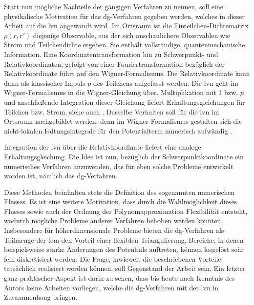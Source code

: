 Statt nun mögliche Nachteile der gängigen Verfahren zu nennen, soll eine physikalische Motivation für das \ac{dg}-Verfahren gegeben werden, welches in dieser Arbeit auf die \ac{lvn} angewandt wird.  Im Ortsraum ist die Einteilchen-Dichtematrix $\rho(r,r')$ diejenige Observable, aus der sich anschaulichere Observablen wie Strom und Teilchendichte ergeben. Sie enthält vollständige, quantenmechanische Information. Eine Koordinatentransformation hin zu Schwerpunkt- und Relativkoordinaten, gefolgt von einer Fouriertransformation bezüglich der Relativkoordinate führt auf den Wigner-Formalismus. Die Relativkoordinate kann dann als klassischer Impuls $p$ des Teilchens aufgefasst werden. Die \ac{lvn} geht im Wigner-Formalismus in die Wigner-Gleichung über. Multiplikation mit 1 bzw. $p$ und anschließende Integration dieser Gleichung liefert Erhaltungsgleichungen für Teilchen bzw. Strom, siehe auch \cite{gardner1998approximation}. Dasselbe Verhalten soll für die \ac{lvn} im Ortsraum nachgebildet werden, denn im Wigner-Formalismus gestalten sich die nicht-lokalen Faltungsintegrale für den Potentialterm numerisch aufwändig \cite{van2017efficient}.

Integration der \ac{lvn} über die Relativkoordinate liefert eine analoge Erhaltungsgleichung. Die Idee ist nun, bezüglich der Schwerpunktkoordinate ein numerisches Verfahren anzuwenden, das für eben solche Probleme entwickelt worden ist, nämlich das \ac{dg}-Verfahren.

Diese Methoden beinhalten stets die Definition des sogenannten numerischen Flusses. Es ist eine weitere Motivation, dass durch die Wahlmöglichkeit dieses Flusses sowie auch der Ordnung der Polynomapproximation Flexibilität entsteht, wodurch mögliche Probleme anderer Verfahren behoben werden könnten. Insbesondere für höherdimensionale Probleme bieten die \ac{dg}-Verfahren als Teilmenge der \ac{fem} den Vorteil einer flexiblen Triangulierung. Bereiche, in denen beispielsweise starke Änderungen des Potentials auftreten, können losgelöst sehr fein diskretisiert werden. Die Frage, inwieweit die beschriebenen Vorteile tatsächlich realisiert werden können, soll Gegenstand der Arbeit sein. Ein letzter ganz praktischer Aspekt ist darin zu sehen, dass bis heute nach Kenntnis des Autors keine Arbeiten vorliegen, welche die \ac{dg}-Verfahren mit der \ac{lvn} in Zusammenhang bringen.
